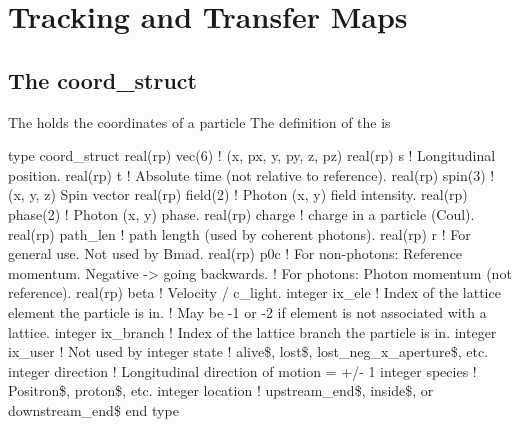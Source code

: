\chapter{Tracking and Transfer Maps}
\label{c:tracking}

\section{The coord_struct}
\label{s:coord.struct}

The  holds the coordinates of a particle The definition of the  is
\begin{example}
  type coord_struct
    real(rp) vec(6)     ! (x, px, y, py, z, pz)
    real(rp) s          ! Longitudinal position.
    real(rp) t          ! Absolute time (not relative to reference).
    real(rp) spin(3)    ! (x, y, z) Spin vector
    real(rp) field(2)   ! Photon (x, y) field intensity.
    real(rp) phase(2)   ! Photon (x, y) phase.
    real(rp) charge     ! charge in a particle (Coul).
    real(rp) path_len   ! path length (used by coherent photons).
    real(rp) r          ! For general use. Not used by Bmad.
    real(rp) p0c        ! For non-photons: Reference momentum. Negative -> going backwards.
                        !     For photons: Photon momentum (not reference).
    real(rp) beta       ! Velocity / c_light. 
    integer ix_ele      ! Index of the lattice element the particle is in.
                        !   May be -1 or -2 if element is not associated with a lattice.
    integer ix_branch   ! Index of the lattice branch the particle is in.
    integer ix_user     ! Not used by \bmad
    integer state       ! alive\$, lost\$, lost_neg_x_aperture\$, etc.
    integer direction   ! Longitudinal direction of motion = +/- 1
    integer species     ! Positron\$, proton\$, etc.
    integer location    ! upstream_end\$, inside\$, or downstream_end\$
end type
\end{example}

